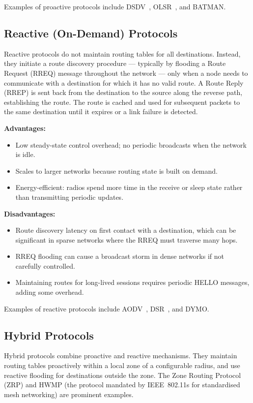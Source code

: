 Examples of proactive protocols include DSDV~\cite{perkins1994dsdv}, OLSR~\cite{clausen2003olsr}, and BATMAN.

\subsection{Reactive (On-Demand) Protocols}

Reactive protocols do not maintain routing tables for all destinations. Instead, they
initiate a route discovery procedure --- typically by flooding a Route Request (RREQ)
message throughout the network --- only when a node needs to communicate with a
destination for which it has no valid route. A Route Reply (RREP) is sent back from
the destination to the source along the reverse path, establishing the route. The route
is cached and used for subsequent packets to the same destination until it expires or a
link failure is detected.

\textbf{Advantages:}
\begin{itemize}
  \item Low steady-state control overhead; no periodic broadcasts when the network is idle.
  \item Scales to larger networks because routing state is built on demand.
  \item Energy-efficient: radios spend more time in the receive or sleep state rather than transmitting periodic updates.
\end{itemize}

\textbf{Disadvantages:}
\begin{itemize}
  \item Route discovery latency on first contact with a destination, which can be significant in sparse networks where the RREQ must traverse many hops.
  \item RREQ flooding can cause a broadcast storm in dense networks if not carefully controlled.
  \item Maintaining routes for long-lived sessions requires periodic HELLO messages, adding some overhead.
\end{itemize}

Examples of reactive protocols include AODV~\cite{perkins2003aodv}, DSR~\cite{johnson2007dsr}, and DYMO.

\subsection{Hybrid Protocols}

Hybrid protocols combine proactive and reactive mechanisms. They maintain routing tables
proactively within a local zone of a configurable radius, and use reactive flooding for
destinations outside the zone. The Zone Routing Protocol (ZRP) and HWMP (the protocol
mandated by IEEE~802.11s for standardised mesh networking) are prominent examples.


